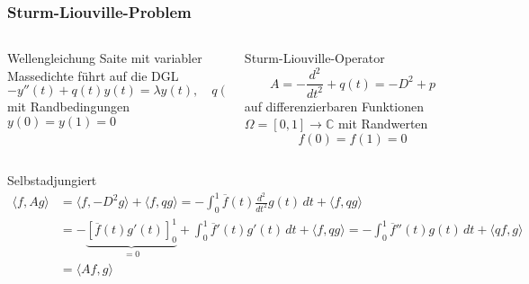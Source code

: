 %
%
%
\bgroup
\begin{frame}[t]
\setlength{\abovedisplayskip}{5pt}
\setlength{\belowdisplayskip}{5pt}
\frametitle{Sturm-Liouville-Problem}
\vspace{-20pt}
\begin{columns}[t,onlytextwidth]
\begin{column}{0.48\textwidth}
\begin{block}{Wellengleichung}
Saite mit variabler Massedichte führt auf die DGL
\[
-y''(t) + q(t) y(t) = \lambda y(t),
\quad
q(t) > 0
\]
mit Randbedingungen $y(0)=y(1)=0$
\end{block}
\end{column}
\begin{column}{0.48\textwidth}
\begin{block}{Sturm-Liouville-Operator}
\[
A=-\frac{d^2}{dt^2} + q(t) = -D^2 + p
\]
auf differenzierbaren Funktionen $\Omega=[0,1]\to\mathbb{C}$ mit Randwerten
\[
f(0)=f(1)=0
\]
\end{block}
\end{column}
\end{columns}
\begin{block}{Selbstadjungiert}
\begin{align*}
\langle f,Ag \rangle
&=
\langle f,-D^2 g\rangle + \langle f,qg\rangle
=
-
\int_0^1 \overline{f}(t) \frac{d^2}{dt^2}g(t)\,dt
+\langle f,qg\rangle
\\
&=-\underbrace{[\overline{f}(t)g'(t)]_0^1}_{\displaystyle=0}
+\int_0^1 \overline{f}'(t)g'(t)\,dt
+\langle f,qg\rangle
=-\int_0^1 \overline{f}''(t)g(t)\,dt
+\langle qf,g\rangle
\\
&=\langle Af,g\rangle
\end{align*}
\end{block}
\end{frame}
\egroup
